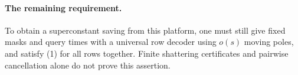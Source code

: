 \documentclass[11pt]{article}
\begin{document}
\paragraph{The remaining requirement.}
To obtain a superconstant saving from this platform, one must still give
fixed masks and query times with a universal row decoder using
$o(s)$ moving poles, and satisfy (1) for all rows together.
Finite shattering certificates and pairwise cancellation alone do not
prove this assertion.
\end{document}
